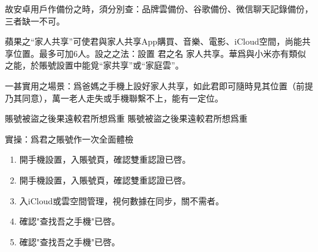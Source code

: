 故安卓用戶作備份之時，須分別查：品牌雲備份、谷歌備份、微信聊天記錄備份，三者缺一不可。


蘋果之“家人共享”可使君與家人共享App購買、音樂、電影、iCloud空間，尚能共享位置。最多可加6人。設之之法：設置 君之名 家人共享。華爲與小米亦有類似之能，於賬號設置中能覓“家共享”或“家庭雲”。

一甚實用之場景：爲爸媽之手機上設好家人共享，如此君即可隨時見其位置（前提乃其同意），萬一老人走失或手機聯繫不上，能有一定位。

\begin{tcbwarn}{賬號被盜之後果遠較君所想爲重}
賬號被盜之後果遠較君所想爲重

\end{tcbwarn}

\begin{tcbpractice}{實操：爲君之賬號作一次全面體檢}
\begin{enumerate}
  \item 開手機設置，入賬號頁，確認雙重認證已啓。
  \item 開手機設置，入賬號頁，確認雙重認證已啓。
  \item 入iCloud或雲空間管理，視何數據在同步，關不需者。
  \item 確認"查找吾之手機"已啓。
  \item 確認"查找吾之手機"已啓。
\end{enumerate}

\end{tcbpractice}
